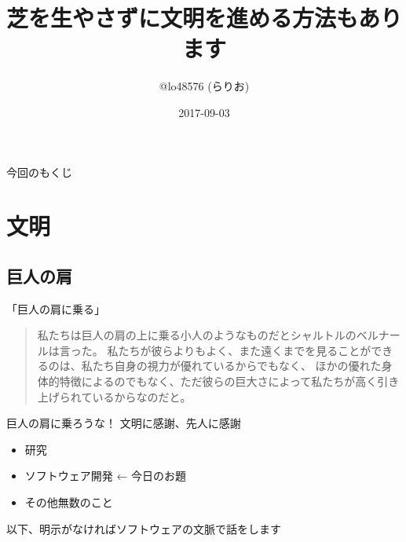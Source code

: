 \documentclass[
        unicode%
    ]{beamer}
\title[文明人]{芝を生やさずに文明を進める方法もあります}
\author{@lo48576 (らりお)}
\institute{ロボット技術研究会}
\date{2017-09-03}
\begin{document}
\frame{\titlepage}

\begin{frame}{今回のもくじ}
    \tableofcontents
\end{frame}

\section{文明}

\subsection{巨人の肩}

\begin{frame}{「巨人の肩に乗る」}
    \begin{quote}
        私たちは巨人の肩の上に乗る小人のようなものだとシャルトルのベルナールは言った。
        私たちが彼らよりもよく、また遠くまでを見ることができるのは、私たち自身の視力が優れているからでもなく、
        ほかの優れた身体的特徴によるのでもなく、ただ彼らの巨大さによって私たちが高く引き上げられているからなのだと。

        \vspace*{\baselineskip}
        \hspace*{}
    \end{quote}
\end{frame}

\begin{frame}{巨人の肩に乗ろうな！}
    文明に感謝、先人に感謝

    \begin{itemize}
        \item 研究
        \item ソフトウェア開発 ← 今日のお題
        \item その他無数のこと
    \end{itemize}

    以下、明示がなければソフトウェアの文脈で話をします
\end{frame}
\end{document}
